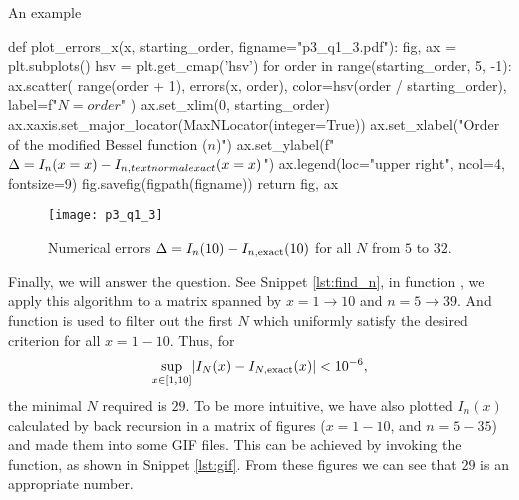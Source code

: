 \begin{algorithm}
    \caption{An example}
    \label{lst:plot_errors_x}
    \begin{pythoncode}
        def plot_errors_x(x, starting_order, figname="p3_q1_3.pdf"):
            fig, ax = plt.subplots()
            hsv = plt.get_cmap('hsv')
            for order in range(starting_order, 5, -1):
                ax.scatter(
                    range(order + 1), errors(x, order),
                    color=hsv(order / starting_order),
                    label=f"$N={order}$"
                )
            ax.set_xlim(0, starting_order)
            ax.xaxis.set_major_locator(MaxNLocator(integer=True))
            ax.set_xlabel("Order of the modified Bessel function ($n$)")
            ax.set_ylabel(f"$\Delta = I_{{n}}(x={x}) - I_{{n,\\textnormal{{exact}}}}(x={x})$")
            ax.legend(loc="upper right", ncol=4, fontsize=9)
            fig.savefig(figpath(figname))
            return fig, ax
        \end{pythoncode}
\end{algorithm}

\begin{figure}
    \centering
    \texttt{[image: p3\_q1\_3]}
    \caption{Numerical errors $\Delta = I_n(10) - I_{n,\textnormal{exact}}(10)$
        for all $N$ from $5$ to $32$.}
    \label{fig:plot_errors_10}
\end{figure}

Finally, we will answer the question. See Snippet \ref{lst:find_n},
in function , we apply this algorithm to a matrix spanned by
$x = 1 \to 10$ and $n = 5 \to 39$.
And function  is used to filter out the first $N$ which uniformly
satisfy the desired criterion for all $x = 1 - 10$.
Thus, for
%
\begin{equation}
    \sup_{x \in [1, 10]} \lvert I_N(x) - I_{N,\textnormal{exact}}(x) \rvert < 10^{-6},
\end{equation}
%
the minimal $N$ required is $29$.
To be more intuitive, we have also plotted $I_n(x)$ calculated by back recursion
in a matrix of figures ($x = 1 - 10$, and $n = 5 - 35$) and made them into some GIF files.
This can be achieved by invoking the  function, as shown in
Snippet \ref{lst:gif}. From these figures we can see that $29$ is an appropriate number.

